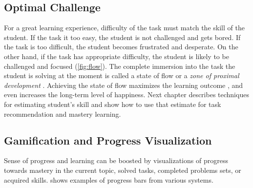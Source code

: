 \subsection{Optimal Challenge}  %
\label{sec:motivation.challenge}
For a great learning experience,
  difficulty of the task must match the skill of the student.
If the task it too easy,
  the student is not challenged and gets bored.
If the task is too difficult,
  the student becomes frustrated and desperate.
On the other hand, if the task has appropriate difficulty,
  the student is likely to be challenged and focused
  (\cref{fig:flow}).
The complete immersion into the task the student is solving at the moment is called
  a state of flow \cite{flow}
  or a \emph{zone of proximal development} \cite{zone-of-proximal-development}.
Achieving the state of flow maximizes the learning outcome \cite{adaptive-practice},
  and even increases the long-term level of happiness. %
Next chapter describes techniques for estimating student’s skill
  and show how to use that estimate for task recommendation and mastery learning.


\subsection{Gamification and Progress Visualization}

Sense of progress and learning can be boosted by visualizations of
progress towards mastery in the current topic, solved tasks, completed problems sets,
or acquired skills.
 shows examples of progress bars from various systems.


